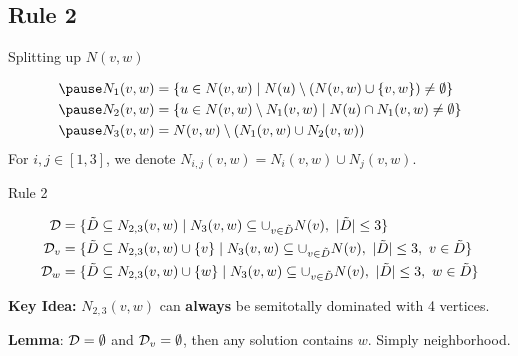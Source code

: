 \subsection{Rule 2}
\begin{frame}[c]{Splitting up $N(v,w)$}

    \begin{figure}[!ht]
    \end{figure}

    \begin{align}
      \pause  N_1(v,w) & = \{u \in N(v,w) \mid N(u) \setminus (N(v,w)\cup \{v,w\}) \neq \emptyset \}  \\
      \pause  N_2(v,w) & = \{u \in N(v,w)\setminus N_1(v,w) \mid N(u) \cap N_1(v,w) \neq \emptyset \} \\
      \pause  N_3(v,w) & =  N(v,w) \setminus (N_1(v,w) \cup N_2(v,w))
    \end{align}
    For $i,j \in [1,3]$, we denote $N_{i,j}(v,w) = N_i(v,w) \cup N_j(v,w)$.
\end{frame}


\begin{frame}[c]{Rule 2}
    \begin{figure}[!ht]
    \end{figure}
    \pause\begin{align}
        \mathcal{D} & = \{ \tilde D \subseteq N_{2,3}(v,w)            \mid N_3(v,w) \subseteq \cup_{v \in \tilde D} N(v),\ |\tilde D| \leq 3                  \} \\
        \mathcal{D}_{v}  & = \{ \tilde D \subseteq N_{2,3}(v,w) \cup \{v\} \mid N_3(v,w) \subseteq \cup_{v \in \tilde D} N(v),\ |\tilde D| \leq 3,\ v \in \tilde D \} \\
        \mathcal{D}_{w}  & = \{ \tilde D \subseteq N_{2,3}(v,w) \cup \{w\} \mid N_3(v,w) \subseteq \cup_{v \in \tilde D} N(v),\ |\tilde D| \leq 3,\ w \in \tilde D \}
    \end{align}
    
    \pause \textbf{Key Idea: } $N_{2,3}(v, w)$ can \textbf{always} be semitotally dominated with 4 vertices.

    \pause \textbf{Lemma}: $\mathcal{D} = \emptyset$ and $\mathcal{D}_{v} = \emptyset$, then any solution contains $w$. Simply neighborhood.
\end{frame}


